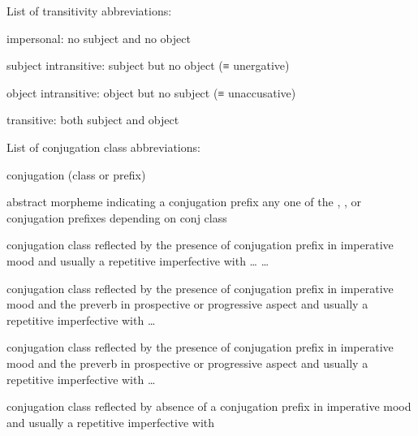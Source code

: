 \vspace{\baselineskip}
\noindent
List of transitivity abbreviations:
\begin{description}[font={\normalfont}, style=sameline, labelindent=\parindent, labelwidth=4em, leftmargin=!]
\item[impers]		impersonal: no subject and no object
\item[subj intr]	subject intransitive: subject but no object (≡ unergative)
\item[obj intr]		object intransitive: object but no subject (≡ unaccusative)
\item[tr]		transitive: both subject and object
\end{description}

\vspace{\baselineskip}
\noindent
List of conjugation class abbreviations:
\begin{description}[font={\normalfont}, style=sameline, labelindent=\parindent, labelwidth=3em, leftmargin=!]
\item[conj]	conjugation (class or prefix)
\item[\fm{\xx{cnj}-}]
		abstract morpheme indicating a conjugation prefix\newline
		any one of the , , or  conjugation prefixes
			depending on conj class
\item[\fm{n}]	 conjugation class\newline
		reflected by the presence of  conjugation prefix in imperative mood\newline
		and usually a repetitive imperfective with  …  … 
\item[\fm{g̱}]	 conjugation class\newline
		reflected by the presence of  conjugation prefix in imperative mood\newline
		and the  preverb in prospective or progressive aspect\newline
		and usually a repetitive imperfective with  … 
\item[\fm{g}]	 conjugation class\newline
		reflected by the presence of  conjugation prefix in imperative mood\newline
		and the  preverb in prospective or progressive aspect
		and usually a repetitive imperfective with  … 
\item[\fm{∅}]	 conjugation class\newline
		reflected by absence of a conjugation prefix in imperative mood\newline
		and usually a repetitive imperfective with 
\end{description}

